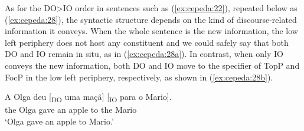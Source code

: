 \documentclass[output=paper,colorlinks,citecolor=brown,nonflat]{./langscibook}
\begin{document}
\ea%
    \label{ex:cepeda:27}
\z

As for the DO>IO order in sentences such as (\ref{ex:cepeda:22}), repeated below as (\ref{ex:cepeda:28}), the syntactic structure depends on the kind of discourse-related information it conveys. When the whole sentence is the new information, the low left periphery does not host any constituent and we could safely say that both DO and IO remain in situ, as in (\ref{ex:cepeda:28a}). In contrast, when only IO conveys the new information, both DO and IO move to the specifier of TopP and FocP in the low left periphery, respectively, as shown in (\ref{ex:cepeda:28b}).

\ea \label{ex:cepeda:28}
	\gll A   Olga deu [\textsubscript{DO} uma maçã] [\textsubscript{IO} para o   Mario].\\
			the Olga gave \hspaceThis{[\textsubscript{DO}} an apple \hspaceThis{[\textsubscript{IO}} to the Mario\\
	\glt ‘Olga gave an apple to Mario.’
		\label{ex:cepeda:28a}
		\label{ex:cepeda:28b}
	\z
\z
\end{document}
